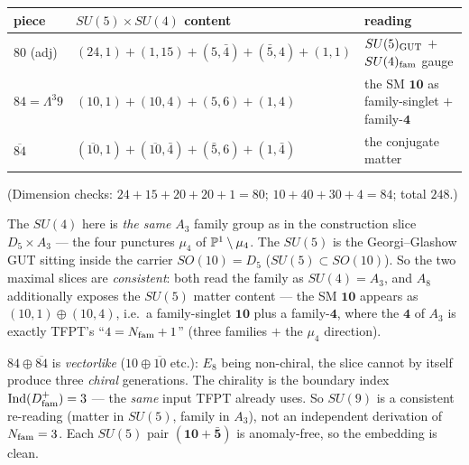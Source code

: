 \begin{center}\small
\renewcommand{\arraystretch}{1.2}
\begin{tabularx}{\linewidth}{@{}llY@{}}
\toprule
piece & $SU(5)\times SU(4)$ content & reading \\
\midrule
$80$ (adj) & $(24,1){+}(1,15){+}(5,\bar4){+}(\bar5,4){+}(1,1)$ & $SU(5)_{\rm GUT}$ $+$ $SU(4)_{\rm fam}$ gauge \\
$84=\Lambda^3 9$ & $(10,1){+}(10,4){+}(5,6){+}(1,4)$ & the SM $\mathbf{10}$ as family-singlet $+$ family-$\mathbf4$ \\
$\overline{84}$ & $(\overline{10},1){+}(\overline{10},\bar4){+}(\bar5,6){+}(1,\bar4)$ & the conjugate matter \\
\bottomrule
\end{tabularx}
\end{center}

\noindent (Dimension checks: $24{+}15{+}20{+}20{+}1=80$; $10{+}40{+}30{+}4=84$; total $248$.)

\begin{winbox}
The $SU(4)$ here is \emph{the same} $A_3$ family group as in the construction slice $D_5\times A_3$ --- the
four punctures $\mu_4$ of $\mathbb{P}^1\setminus\mu_4$. The $SU(5)$ is the Georgi--Glashow GUT sitting inside the
carrier $SO(10)=D_5$ ($SU(5)\subset SO(10)$). So the two maximal slices are \emph{consistent}: both read
the family as $SU(4){=}A_3$, and $A_8$ additionally exposes the $SU(5)$ matter content --- the SM
$\mathbf{10}$ appears as $(10,1)\oplus(10,4)$, i.e.\ a family-singlet $\mathbf{10}$ plus a family-$\mathbf4$,
where the $\mathbf4$ of $A_3$ is exactly TFPT's ``$4=N_{\mathrm{fam}}+1$'' (three families $+$ the $\mu_4$ direction).
\end{winbox}

\begin{gapbox}
$84\oplus\overline{84}$ is \emph{vectorlike} ($10\oplus\overline{10}$ etc.): $E_8$ being non-chiral, the
slice cannot by itself produce three \emph{chiral} generations. The chirality is the boundary index
$\operatorname{Ind}(D^+_{\rm fam})=3$ --- the \emph{same} input TFPT already uses. So $SU(9)$ is a
consistent re-reading (matter in $SU(5)$, family in $A_3$), not an independent derivation of $N_{\mathrm{fam}}=3$.
Each $SU(5)$ pair $(\mathbf{10}+\bar{\mathbf5})$ is anomaly-free, so the embedding is clean. \mC
\end{gapbox}

